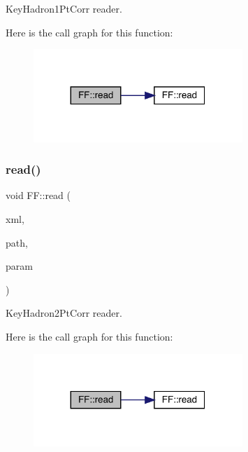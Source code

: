 Key\+Hadron1\+Pt\+Corr reader. 

Here is the call graph for this function\+:
\nopagebreak
\begin{figure}[H]
\begin{center}
\leavevmode
\includegraphics[width=224pt]{d5/da6/namespaceFF_acb4db5dbe27937736b4f2cbed9694c56_cgraph}
\end{center}
\end{figure}
\mbox{\label{namespaceFF_ac879699f10e046e5a2059a2efcf1408b}} 
\subsubsection{\texorpdfstring{read()}{read()}\hspace{0.1cm}{\footnotesize\ttfamily [3/15]}}
{\footnotesize\ttfamily void F\+F\+::read (\begin{DoxyParamCaption}\item[{X\+M\+L\+Reader \&}]{xml,  }\item[{const std\+::string \&}]{path,  }\item[{\mbox{\hyperlink{structFF_1_1KeyHadron2PtCorr__t}{Key\+Hadron2\+Pt\+Corr\+\_\+t}} \&}]{param }\end{DoxyParamCaption})}



Key\+Hadron2\+Pt\+Corr reader. 

Here is the call graph for this function\+:
\nopagebreak
\begin{figure}[H]
\begin{center}
\leavevmode
\includegraphics[width=224pt]{d5/da6/namespaceFF_ac879699f10e046e5a2059a2efcf1408b_cgraph}
\end{center}
\end{figure}
\mbox{\label{namespaceFF_ab0ac23f91d1403059f1df825a7ab775f}} 
